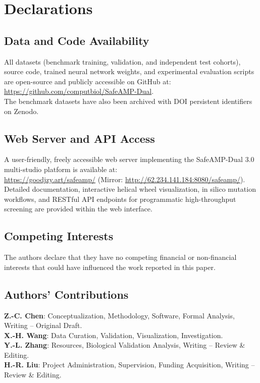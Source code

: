 \documentclass[11pt,a4paper]{article}
\begin{document}
\newpage

\section*{Declarations}

\subsection*{Data and Code Availability}
All datasets (benchmark training, validation, and independent test cohorts), source code, trained neural network weights, and experimental evaluation scripts are open-source and publicly accessible on GitHub at: \\
\url{https://github.com/computbiol/SafeAMP-Dual}. \\
The benchmark datasets have also been archived with DOI persistent identifiers on Zenodo.

\subsection*{Web Server and API Access}
A user-friendly, freely accessible web server implementing the SafeAMP-Dual 3.0 multi-studio platform is available at: \\
\url{https://goodjzy.art/safeamp/} (Mirror: \url{http://62.234.141.184:8080/safeamp/}). \\
Detailed documentation, interactive helical wheel visualization, in silico mutation workflows, and RESTful API endpoints for programmatic high-throughput screening are provided within the web interface.

\subsection*{Competing Interests}
The authors declare that they have no competing financial or non-financial interests that could have influenced the work reported in this paper.

\subsection*{Authors' Contributions}
\textbf{Z.-C. Chen}: Conceptualization, Methodology, Software, Formal Analysis, Writing -- Original Draft. \\
\textbf{X.-H. Wang}: Data Curation, Validation, Visualization, Investigation. \\
\textbf{Y.-L. Zhang}: Resources, Biological Validation Analysis, Writing -- Review \& Editing. \\
\textbf{H.-R. Liu}: Project Administration, Supervision, Funding Acquisition, Writing -- Review \& Editing.
\end{document}

